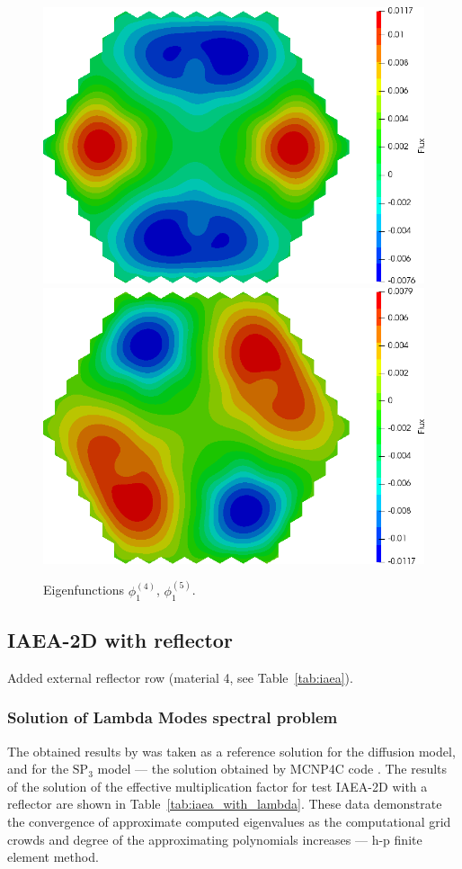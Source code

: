 \documentclass[authoryear]{elsarticle}
\begin{document}
\begin{figure}[H]
\begin{center}
	\includegraphics[width=0.49\linewidth]{iaea_without/alpha_delayed_sp3_u1_4_without.png}
	\includegraphics[width=0.49\linewidth]{iaea_without/alpha_delayed_sp3_u1_5_without.png}\\
	\caption{Eigenfunctions $\phi_1^{(4)}$, $\phi_1^{(5)}$.}
	\label{fig:iaea_without_fun_del_3}
\end{center}
\end{figure}

\subsection{IAEA-2D with reflector}
Added external reflector row (material 4, see Table~\ref{tab:iaea}). 

\subsubsection{Solution of Lambda Modes spectral problem}

The obtained results by \citep{avvakumov2015} was taken as a reference solution for the diffusion model, and for the $\mathrm{SP_3}$ model ---  the solution obtained by MCNP4C code \citep{ryu2010development}.
The results of the solution of the effective multiplication factor for test IAEA-2D with a reflector are shown in Table~\ref{tab:iaea_with_lambda}. 
These data demonstrate the convergence of approximate computed eigenvalues as the computational grid crowds and degree of the approximating polynomials increases --- h-p finite element method.
\end{document}
